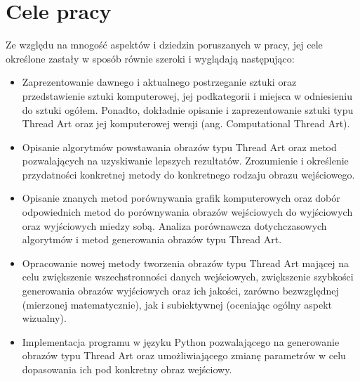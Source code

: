 \documentclass[a4paper, 12pt, polish, twoside]{extreport}
\begin{document}
    \section{Cele pracy} \label{intro-goals}
    Ze względu na mnogość aspektów i dziedzin poruszanych w pracy, jej cele określone zastały w sposób równie szeroki i wyglądają następująco: 
    \begin{itemize}
        \item Zaprezentowanie dawnego i aktualnego postrzeganie sztuki oraz przedstawienie sztuki komputerowej, jej podkategorii i miejsca w odniesieniu do sztuki ogółem. Ponadto, dokładnie opisanie i zaprezentowanie sztuki typu Thread Art oraz jej komputerowej wersji (ang. Computational Thread Art).
        \item Opisanie algorytmów powstawania obrazów typu Thread Art oraz metod pozwalających na uzyskiwanie lepszych rezultatów. Zrozumienie i określenie przydatności konkretnej metody do konkretnego rodzaju obrazu wejściowego.
        \item Opisanie znanych metod porównywania grafik komputerowych oraz dobór odpowiednich metod do porównywania obrazów wejściowych do wyjściowych oraz wyjściowych miedzy sobą. Analiza porównawcza dotychczasowych algorytmów i metod generowania obrazów typu Thread Art.
        \item Opracowanie nowej metody tworzenia obrazów typu Thread Art mającej na celu zwiększenie wszechstronności danych wejściowych, zwiększenie szybkości generowania obrazów wyjściowych oraz ich jakości, zarówno bezwzględnej (mierzonej matematycznie), jak i subiektywnej (oceniając ogólny aspekt wizualny).
        \item Implementacja programu w języku Python pozwalającego na generowanie obrazów typu Thread Art oraz umożliwiającego zmianę parametrów w celu dopasowania ich pod konkretny obraz wejściowy.
    \end{itemize}
\end{document}
